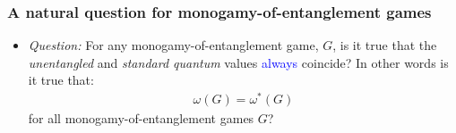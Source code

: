 \documentclass{beamer}
\newcommand{\abs}[1]{\lvert #1 \rvert}
\newcommand{\biggip}[2]{\biggl\langle #1, #2 \biggr\rangle}
\newcommand{\tr}{\operatorname{Tr}}
\begin{document}
%           
%
%

\begin{frame}
	\frametitle{A natural question for monogamy-of-entanglement games}
\begin{itemize}
\item \emph{Question:} For any monogamy-of-entanglement game, $G$, is it true that the \emph{unentangled} and \emph{standard quantum} values \textcolor{blue}{always} coincide? In other words is it true that:
	\begin{align*}
		\omega(G) = \omega^*(G)
	\end{align*}
for all monogamy-of-entanglement games $G$?
\end{itemize}
\end{frame}
\end{document}
